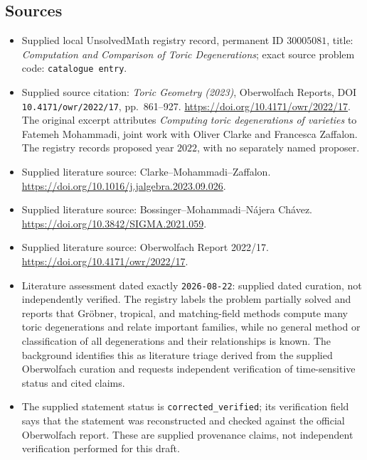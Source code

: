 \documentclass[11pt]{article}
\begin{document}
\subsection{Sources}
\begin{itemize}
\item Supplied local UnsolvedMath registry record, permanent ID \(30005081\), title: \emph{Computation and Comparison of Toric Degenerations}; exact source problem code: \texttt{catalogue entry}.
\item Supplied source citation: \emph{Toric Geometry (2023)}, Oberwolfach Reports, DOI \texttt{10.4171/owr/2022/17}, pp.\ 861--927. \url{https://doi.org/10.4171/owr/2022/17}. The original excerpt attributes \emph{Computing toric degenerations of varieties} to Fatemeh Mohammadi, joint work with Oliver Clarke and Francesca Zaffalon. The registry records proposed year \(2022\), with no separately named proposer.
\item Supplied literature source: Clarke--Mohammadi--Zaffalon. \url{https://doi.org/10.1016/j.jalgebra.2023.09.026}.
\item Supplied literature source: Bossinger--Mohammadi--Nájera Chávez. \url{https://doi.org/10.3842/SIGMA.2021.059}.
\item Supplied literature source: Oberwolfach Report 2022/17. \url{https://doi.org/10.4171/owr/2022/17}.
\item Literature assessment dated exactly \texttt{2026-08-22}: supplied dated curation, not independently verified. The registry labels the problem partially solved and reports that Gröbner, tropical, and matching-field methods compute many toric degenerations and relate important families, while no general method or classification of all degenerations and their relationships is known. The background identifies this as literature triage derived from the supplied Oberwolfach curation and requests independent verification of time-sensitive status and cited claims.
\item The supplied statement status is \texttt{corrected\_verified}; its verification field says that the statement was reconstructed and checked against the official Oberwolfach report. These are supplied provenance claims, not independent verification performed for this draft.
\end{itemize}
\end{document}
